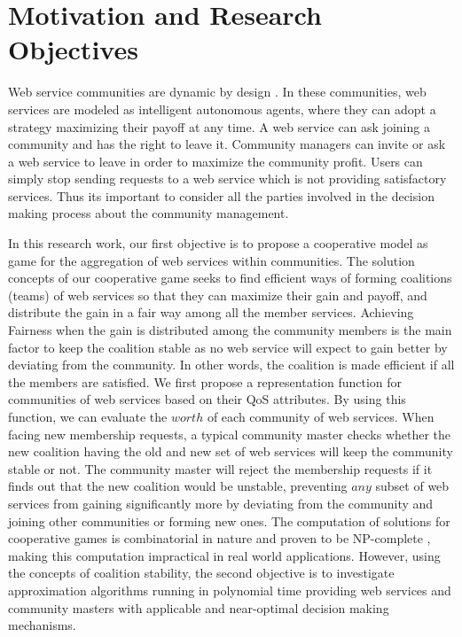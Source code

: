 \section{Motivation and Research Objectives}\label{sec:motexample}

Web service communities are dynamic by design
\cite{DBLP:journals/ijebr/MaamarSTBB09}. In these communities, web
services are modeled as intelligent autonomous agents, where they
can adopt a strategy maximizing their payoff at any time. A web
service can ask joining a community and has the right to leave it.
Community managers can invite or ask a web service to leave in
order to maximize the community profit. Users can simply stop
sending requests to a web service which is not providing
satisfactory services. Thus its important to consider all the
parties involved in the decision making process about the
community management. 

In this research work, our first objective is to propose a
cooperative model as game for the aggregation of web services
within communities. The solution concepts of our cooperative game
seeks to find efficient ways of forming coalitions (teams) of web
services so that they can maximize their gain and payoff, and
distribute the gain in a fair way among all the member services.
Achieving Fairness when the gain is distributed among the
community members is the main factor to keep the coalition stable
as no web service will expect to gain better by deviating from the
community. In other words, the coalition is made efficient if all
the members are satisfied. We first propose a representation
function for communities of web services based on their QoS
attributes. By using this function, we can evaluate the $worth$ of
each community of web services. When facing new membership
requests, a typical community master checks whether the new
coalition having the old and new set of web services will keep the
community stable or not. The community master will reject the
membership requests if it finds out that the new coalition would
be unstable, preventing $any$ subset of web services from gaining
significantly more by deviating from the community and joining
other communities or forming new ones. The computation of
solutions for cooperative games is combinatorial in nature and
proven to be NP-complete \cite{Algorithmic}, making this
computation impractical in real world applications. However, using
the concepts of coalition stability, the second objective is to
investigate approximation algorithms running in polynomial time
providing web services and community masters with applicable and
near-optimal decision making mechanisms.

